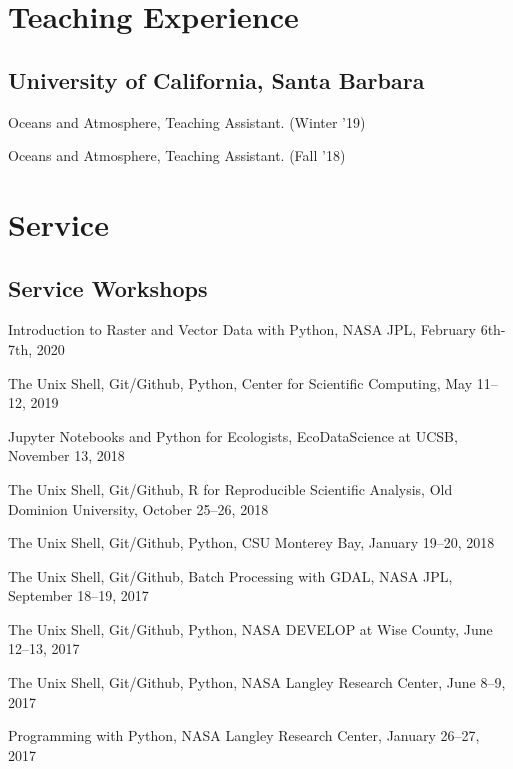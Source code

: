 \documentclass[12pt,letterpaper]{report}
\newcommand{\listitemspace}{0.15em}
\renewenvironment{itemize}
{\begin{list}{}{\setlength{\leftmargin}{0em}
			\setlength{\parskip}{0em}
			\setlength{\itemsep}{\listitemspace}
			\setlength{\parsep}{\listitemspace}}}
	{\end{list}}
\begin{document}
	
	
	\section*{Teaching Experience}
	
	\subsection*{University of California, Santa Barbara}
	
	\begin{itemize}
		
        \item Oceans and Atmosphere, Teaching Assistant. (Winter '19)

		\item Oceans and Atmosphere, Teaching Assistant. (Fall '18)
		
	\end{itemize}
	
	
	
	\section*{Service}
	
	\subsection*{Service Workshops}
	
	\begin{itemize}
		
		\item Introduction to Raster and Vector Data with Python, NASA JPL, February 6th-7th, 2020
		
        \item The Unix Shell, Git/Github, Python, Center for Scientific Computing, May 11--12, 2019

        \item Jupyter Notebooks and Python for Ecologists, EcoDataScience at UCSB, November 13, 2018

        \item The Unix Shell, Git/Github, R for Reproducible Scientific Analysis, Old Dominion University, October 25--26, 2018

        \item The Unix Shell, Git/Github, Python, CSU Monterey Bay, January 19--20, 2018

        \item The Unix Shell, Git/Github, Batch Processing with GDAL, NASA JPL, September 18--19, 2017

        \item The Unix Shell, Git/Github, Python, NASA DEVELOP at Wise County, June 12--13, 2017

        \item The Unix Shell, Git/Github, Python, NASA Langley Research Center, June 8--9, 2017
		
        \item Programming with Python, NASA Langley Research Center, January 26--27, 2017 
		
	\end{itemize}
	
\end{document}
